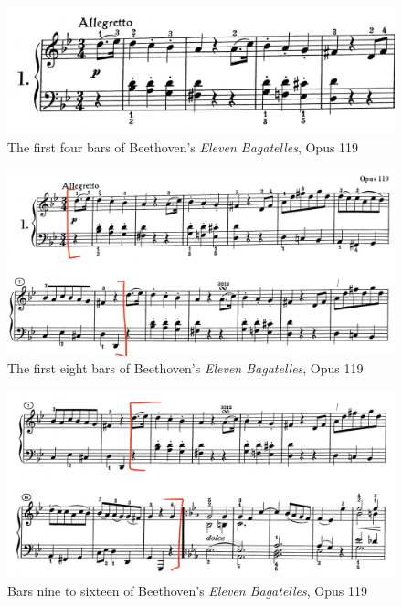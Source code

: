 \begin{figure}
	\centering
	\includegraphics[width=\textwidth]{figures/beethoven-first-a-section-first-four-bars.jpg}
	\caption{The first four bars of Beethoven's \textit{Eleven Bagatelles}, Opus 119}
	\label{fig:beethoven-first-a-section-first-four-bars}
\end{figure}

\begin{figure}
  \centering
  \includegraphics[width=\textwidth]{figures/beethoven-first-a-section-first-eight-bars.jpg}
  \caption{The first eight bars of Beethoven's \textit{Eleven Bagatelles}, Opus 119}
  \label{fig:beethoven-first-a-section-first-eight-bars}
\end{figure}

\begin{figure}
  \centering
  \includegraphics[width=\textwidth]{figures/beethoven-first-a-section-bars-nine-to-sixteen.jpg}
  \caption{Bars nine to sixteen of Beethoven's \textit{Eleven Bagatelles}, Opus 119}
  \label{fig:beethoven-first-a-section-bars-nine-to-sixteen}
\end{figure}

